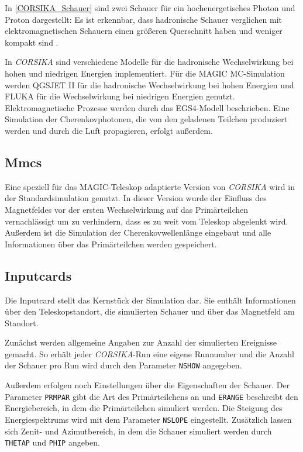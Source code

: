 In \autoref{CORSIKA_Schauer} sind zwei Schauer für ein hochenergetisches Photon und Proton dargestellt: 
Es ist erkennbar, dass hadronische Schauer verglichen mit elektromagnetischen Schauern einen größeren Querschnitt haben und weniger kompakt sind .

In \textit{CORSIKA} sind verschiedene Modelle für die hadronische Wechselwirkung bei hohen und niedrigen Energien implementiert.
Für die MAGIC MC-Simulation werden QGSJET II für die hadronische Wechselwirkung bei hohen Energien und FLUKA für die Wechselwirkung bei niedrigen Energien genutzt.
Elektromagnetische Prozesse werden durch das EGS4-Modell beschrieben.
Eine Simulation der Cherenkovphotonen, die von den geladenen Teilchen produziert werden und durch die Luft propagieren, erfolgt außerdem.

\subsection{Mmcs}
Eine speziell für das MAGIC-Teleskop adaptierte Version von \textit{CORSIKA} wird in der Standardsimulation genutzt.
In dieser Version wurde der Einfluss des Magnetfeldes vor der ersten Wechselwirkung auf das Primärteilchen vernachlässigt um zu verhindern, dass es zu weit vom Teleskop abgelenkt wird.
Außerdem ist die Simulation der Cherenkovwellenlänge eingebaut und alle Informationen über das Primärteilchen werden gespeichert.

\subsection{Inputcards}
Die Inputcard stellt das Kernstück der Simulation dar.
Sie enthält Informationen über den Teleskopstandort, die simulierten Schauer und über das Magnetfeld am Standort.

Zunächst werden allgemeine Angaben zur Anzahl der simulierten Ereignisse gemacht. 
So erhält jeder \textit{CORSIKA}-Run eine eigene Runnumber und die Anzahl der Schauer pro Run wird durch den Parameter \texttt{NSHOW} angegeben.

Außerdem erfolgen noch Einstellungen über die Eigenschaften der Schauer.
Der Parameter \texttt{PRMPAR} gibt die Art des Primärteilchens an und \texttt{ERANGE} beschreibt den Energiebereich, in dem die Primärteilchen simuliert werden.
Die Steigung des Energiespektrums wird mit dem Parameter \texttt{NSLOPE} eingestellt.
Zusätzlich lassen sich Zenit- und Azimutbereich, in dem die Schauer simuliert werden durch \texttt{THETAP} und \texttt{PHIP} angeben.

